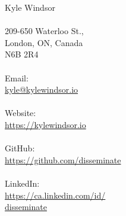 
\begin{minipage}[t]{0.25\hsize} %
	{\huge Kyle Windsor}\\
	\vspace{0.1in}\\
	{\color{contact}
	209-650 Waterloo St.,\\
	London, ON, Canada\\
	N6B 2R4\\
	\\
	Email:\\
	\href{mailto:kyle@kylewindsor.io}{kyle@kylewindsor.io}\\
	\\
	Website:\\
	\href{https://kylewindsor.io}{https://kylewindsor.io}\\
	\\
	GitHub:\\
	\href{https://github.com/disseminate/}{https://github.com/disseminate}\\
	\\
	LinkedIn:\\
	\href{https://ca.linkedin.com/in/disseminate}{https://ca.linkedin.com/id/\\disseminate}\\
	\\
	}
\end{minipage}
